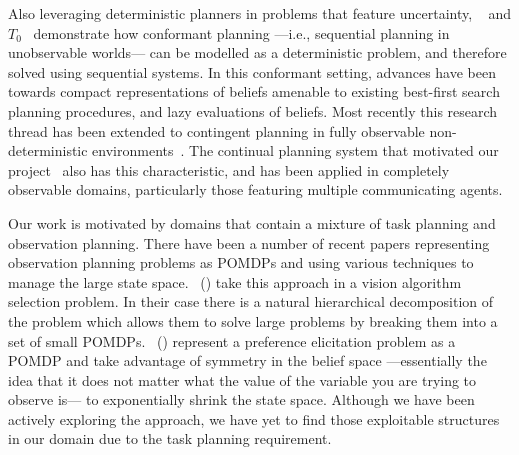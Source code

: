 \documentclass{article}
\begin{document}



Also leveraging deterministic planners in problems that feature
uncertainty, ~\cite{hoffmann:brafman:2006} and
$T_0$~\cite{palacios:geffner:2009} demonstrate how conformant planning
---i.e., sequential planning in unobservable worlds--- can be modelled
as a deterministic problem, and therefore solved using sequential
systems. In this conformant setting, advances have been towards
compact representations of beliefs amenable to existing best-first
search planning procedures, and lazy evaluations of beliefs. Most
recently this research thread has been extended to contingent planning
in fully observable non-deterministic
environments~\cite{albore:etal:2009}.
The continual planning system that motivated our
project~\cite{brenner:nebel:jaamas09} also has this characteristic,
and has been applied in completely observable domains, particularly
those featuring multiple communicating agents. 


Our work is motivated by domains that contain a mixture of task
planning and observation planning. There have been a number of recent
papers representing observation planning problems as POMDPs and using
various techniques to manage the large state
space. \citeauthor{hippo-jnl}~(\citeyear{hippo-jnl}) take this
approach in a vision algorithm selection problem. In their case there
is a natural hierarchical decomposition of the problem which allows
them to solve large problems by breaking them into a set of small
POMDPs. \citeauthor{doshi08:pref_elic}~(\citeyear{doshi08:pref_elic})
represent a preference elicitation problem as a POMDP and take
advantage of symmetry in the belief space ---essentially the idea that
it does not matter what the value of the variable you are trying to
observe is--- to exponentially shrink the state space. Although we
have been actively exploring the \citeauthor{doshi08:pref_elic}
approach, we have yet to find those exploitable structures in our
domain due to the task planning requirement.
\end{document}
